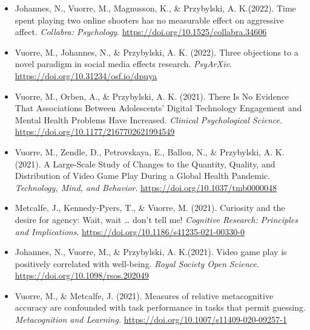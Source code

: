 \documentclass[12pt, a4paper]{article}
\newcommand{\years}[1]{\marginnote{\scriptsize #1}}
\begin{document}
\begin{itemize}
  \item Johannes, N.\footnotemark[1], Vuorre, M.\footnotemark[1], Magnusson, K., \& Przybylski, A. K.\footnotemark[1] (2022). Time spent playing two online shooters has no measurable effect on aggressive affect. \emph{Collabra: Psychology}. \url{https://doi.org/10.1525/collabra.34606}
  \item Vuorre, M., Johannes, N., \& Przybylski, A. K. (2022). Three objections to a novel paradigm in social media effects research. \emph{PsyArXiv}. \url{https://doi.org/10.31234/osf.io/dpuya}
  \item \years{2021} Vuorre, M., Orben, A., \& Przybylski, A. K. (2021). There Is No Evidence That Associations Between Adolescents’ Digital Technology Engagement and Mental Health Problems Have Increased. \emph{Clinical Psychological Science}. \\ \url{https://doi.org/10.1177/2167702621994549}
  \item Vuorre, M., Zendle, D., Petrovskaya, E., Ballou, N., \& Przybylski, A. K. (2021). A Large-Scale Study of Changes to the Quantity, Quality, and Distribution of Video Game Play During a Global Health Pandemic. \emph{Technology, Mind, and Behavior}. \url{https://doi.org/10.1037/tmb0000048}
  \item Metcalfe, J., Kennedy-Pyers, T., \& Vuorre, M. (2021). Curiosity and the desire for agency: Wait, wait … don’t tell me! \emph{Cognitive Research: Principles and Implications}. \url{https://doi.org/10.1186/s41235-021-00330-0}
  \item Johannes, N.\footnotemark[1], Vuorre, M.\footnotemark[1], \& Przybylski, A. K.\footnotemark[1] (2021). Video game play is positively correlated with well-being. \emph{Royal Society Open Science}. \url{https://doi.org/10.1098/rsos.202049}
  \item Vuorre, M., \& Metcalfe, J. (2021). Measures of relative metacognitive accuracy are confounded with task performance in tasks that permit guessing. \emph{Metacognition and Learning.} \url{https://doi.org/10.1007/s11409-020-09257-1}


\end{itemize}
\end{document}

